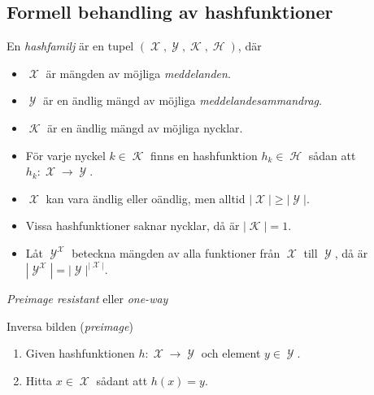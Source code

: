 \documentclass{beamer}
\theoremstyle{definition}
\DeclareMathOperator{\K}{\mathcal{K}}
\DeclareMathOperator{\X}{\mathcal{X}}
\DeclareMathOperator{\Y}{\mathcal{Y}}
\DeclareMathOperator{\h}{\mathcal{H}}
\let\H\h
\begin{document}
\subsection{Formell behandling av hashfunktioner}

\begin{frame}{\insertsubsectionhead}
  \begin{definition}
    En \emph{hashfamilj} är en tupel \((\X, \Y, \K, \H)\), där
    \begin{itemize}
      \item \(\X\) är mängden av möjliga \emph{meddelanden}.

      \item \(\Y\) är en ändlig mängd av möjliga \emph{meddelandesammandrag}.

      \item \(\K\) är en ändlig mängd av möjliga nycklar.

      \item För varje nyckel \(k\in \K\) finns en hashfunktion \(h_k\in \H\) 
        sådan att \(h_k\colon \X\to \Y\).

    \end{itemize}
  \end{definition}
\end{frame}

\begin{frame}{\insertsubsectionhead}
  \begin{itemize}
    \item \(\X\) kan vara ändlig eller oändlig, men alltid \(|\X|\geq |\Y|\).

    \item Vissa hashfunktioner saknar nycklar, då är \(|\K| = 1\).

    \item Låt \(\Y^{\X}\) beteckna mängden av alla funktioner från \(\X\) till 
      \(\Y\), då är \(|\Y^{\X}| = |\Y|^{|\X|}\).

  \end{itemize}
\end{frame}

\begin{frame}{\insertsubsectionhead}{\emph{Preimage resistant} eller 
  \emph{one-way}}
  \begin{block}{Inversa bilden (\emph{preimage})}
    \begin{enumerate}
      \item Given hashfunktionen \(h\colon \X\to \Y\) och element \(y\in \Y\).
      \item Hitta \(x\in \X\) sådant att \(h(x) = y\).
    \end{enumerate}
  \end{block}
\end{frame}
\end{document}
